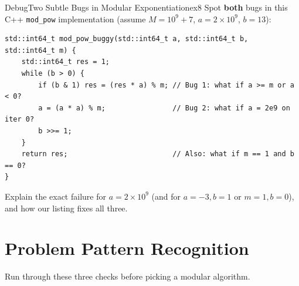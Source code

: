 \documentclass[11pt,a4paper]{article}
\theoremstyle{definition}
\begin{document}
\begin{tryitbox}{Debug}{Two Subtle Bugs in Modular Exponentiation}{ex8}
Spot \textbf{both} bugs in this C++ \texttt{mod\_pow} implementation (assume $M = 10^9 + 7$, $a = 2 \times 10^9$, $b = 13$):
\begin{lstlisting}[numbers=none, xleftmargin=4pt, framexleftmargin=4pt]
std::int64_t mod_pow_buggy(std::int64_t a, std::int64_t b, std::int64_t m) {
    std::int64_t res = 1;
    while (b > 0) {
        if (b & 1) res = (res * a) % m; // Bug 1: what if a >= m or a < 0?
        a = (a * a) % m;                // Bug 2: what if a = 2e9 on iter 0?
        b >>= 1;
    }
    return res;                         // Also: what if m == 1 and b == 0?
}
\end{lstlisting}
Explain the exact failure for $a = 2 \times 10^9$ (and for $a = -3, b = 1$ or $m = 1, b = 0$), and how our listing fixes all three.
\end{tryitbox}

\section{Problem Pattern Recognition}

Run through these three checks before picking a modular algorithm.
\end{document}

